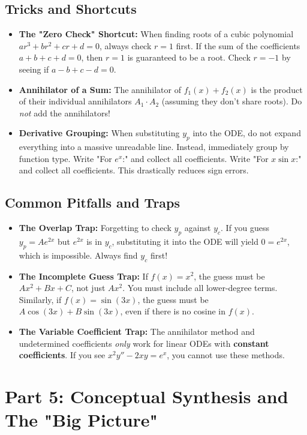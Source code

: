 \documentclass[11pt]{article}
\begin{document}
\subsection{Tricks and Shortcuts}
\begin{itemize}
    \item \textbf{The "Zero Check" Shortcut:} When finding roots of a cubic polynomial $ar^3 + br^2 + cr + d = 0$, always check $r=1$ first. If the sum of the coefficients $a+b+c+d = 0$, then $r=1$ is guaranteed to be a root. Check $r=-1$ by seeing if $a-b+c-d = 0$.
    \item \textbf{Annihilator of a Sum:} The annihilator of $f_1(x) + f_2(x)$ is the product of their individual annihilators $A_1 \cdot A_2$ (assuming they don't share roots). Do \textit{not} add the annihilators!
    \item \textbf{Derivative Grouping:} When substituting $y_p$ into the ODE, do not expand everything into a massive unreadable line. Instead, immediately group by function type. Write "For $e^x$:" and collect all coefficients. Write "For $x \sin x$:" and collect all coefficients. This drastically reduces sign errors.
\end{itemize}

\subsection{Common Pitfalls and Traps}
\begin{itemize}
    \item \textbf{The Overlap Trap:} Forgetting to check $y_p$ against $y_c$. If you guess $y_p = A e^{2x}$ but $e^{2x}$ is in $y_c$, substituting it into the ODE will yield $0 = e^{2x}$, which is impossible. Always find $y_c$ first!
    \item \textbf{The Incomplete Guess Trap:} If $f(x) = x^2$, the guess must be $A x^2 + B x + C$, not just $A x^2$. You must include all lower-degree terms. Similarly, if $f(x) = \sin(3x)$, the guess must be $A \cos(3x) + B \sin(3x)$, even if there is no cosine in $f(x)$.
    \item \textbf{The Variable Coefficient Trap:} The annihilator method and undetermined coefficients \textit{only} work for linear ODEs with \textbf{constant coefficients}. If you see $x^2 y'' - 2xy = e^x$, you cannot use these methods.
\end{itemize}

\newpage
\section{Part 5: Conceptual Synthesis and The "Big Picture"}
\end{document}

